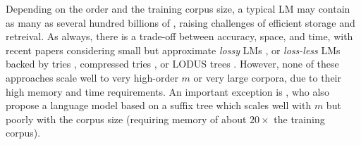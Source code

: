 Depending on the order and the training corpus size, a typical \ngram
LM may contain as many as several hundred billions of \ngrams
\cite{brants2007large},
raising challenges of efficient storage and retreival.
%
As always, there is a trade-off between accuracy, space, and time, with recent papers considering small but approximate  \emph{lossy} LMs 
\cite{Chazelle:2004:BFE:982792.982797,talbot_and_osborne_08_or_thereabouts,guthrie2010storing},
or \emph{loss-less} LMs 
backed by tries \cite{stolcke2011srilm},
compressed tries
\cite{Germann:2009:TPT:1621947.1621952,heafield2011kenlm,pauls2011faster}, 
or LODUS trees \cite{sall11,DBLP:conf/acl/WatanabeTI09}.
However, none of these approaches scale well to very high-order $m$
or very large corpora, due to their high memory and time requirements.
An important exception is
, who also propose a language model
based on a suffix tree which scales well with $m$ but poorly with the corpus size (requiring memory of
about $20\times$ the training corpus).

%
% 


